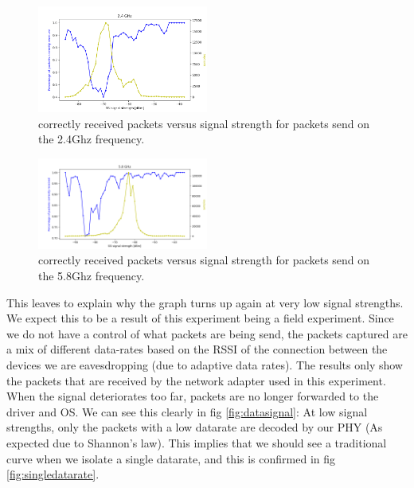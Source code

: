 \documentclass{IEEEtran}
\begin{document}
\begin{figure}
		\includegraphics[width=0.5\textwidth]{figures/24ghz.png}
		\caption{correctly received packets versus signal strength for packets send on the 2.4Ghz frequency.}
		\label{fig:24packets}
\end{figure}

\begin{figure}
		\includegraphics[width=0.5\textwidth]{figures/58ghz.png}
		\caption{correctly received packets versus signal strength for packets send on the 5.8Ghz frequency.}
		\label{fig:58packets}
\end{figure}

This leaves to explain why the graph turns up again at very low signal strengths. We expect this to be a result of this experiment being a field experiment. Since we do not have a control of what packets are being send, the packets captured are a mix of different data-rates based on the RSSI of the connection between the devices we are eavesdropping (due to adaptive data rates). The results only show the packets that are received by the network adapter used in this experiment. When the signal deteriorates too far, packets are no longer forwarded to the driver and OS. We can see this clearly in fig \ref{fig:datasignal}: At low signal strengths, only the packets with a low datarate are decoded by our PHY (As expected due to Shannon's law). This implies that we should see a traditional curve when we isolate a single datarate, and this is confirmed in fig \ref{fig:singledatarate}.
\end{document}
